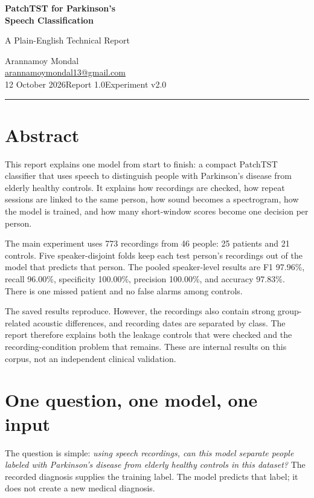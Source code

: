 \documentclass[11pt,a4paper]{article}
\begin{document}
\begin{center}
{\LARGE\bfseries PatchTST for Parkinson's\\[3pt] Speech Classification\par}
\vspace{8pt}
{\large A Plain-English Technical Report\par}
\vspace{10pt}
Arannamoy Mondal\\
\href{mailto:arannamoymondal13@gmail.com}{arannamoymondal13@gmail.com}\\[5pt]
12 October 2026\quad\textbullet\quad Report 1.0\quad\textbullet\quad Experiment v2.0
\end{center}
\vspace{3pt}\hrule\vspace{8pt}

\section*{Abstract}
This report explains one model from start to finish: a compact PatchTST classifier
that uses speech to distinguish people with Parkinson's disease from elderly
healthy controls. It explains how recordings are checked, how repeat sessions
are linked to the same person, how sound becomes a spectrogram, how the model is
trained, and how many short-window scores become one decision per person.

The main experiment uses 773 recordings from 46 people: 25 patients and 21
controls. Five speaker-disjoint folds keep each test person's recordings out of
the model that predicts that person. The pooled speaker-level results are F1
97.96\%, recall 96.00\%, specificity 100.00\%, precision 100.00\%, and accuracy
97.83\%. There is one missed patient and no false alarms among controls.

The saved results reproduce. However, the recordings also contain strong
group-related acoustic differences, and recording dates are separated by class.
The report therefore explains both the leakage controls that were checked and
the recording-condition problem that remains. These are internal results on
this corpus, not an independent clinical validation.

\section{One question, one model, one input}
The question is simple: \emph{using speech recordings, can this model separate
people labeled with Parkinson's disease from elderly healthy controls in this
dataset?} The recorded diagnosis supplies the training label. The model predicts
that label; it does not create a new medical diagnosis.
\end{document}
